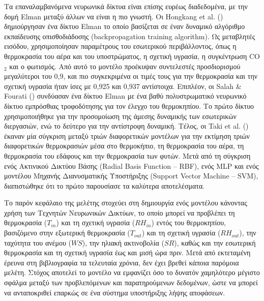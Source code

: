 \documentclass[12pt, a4paper]{report} %
\newcommand{\english}{\foreignlanguage{english}}
\begin{document}
Τα επαναλαμβανόμενα νευρωνικά δίκτυα είναι επίσης ευρέως διαδεδομένα, με την δομή \english{Elman} μεταξύ άλλων να είναι 
η πιο γνωστή. Οι \english{Hongkang et al.} (\citeyear{neural_bib14}) δημιούργησαν ένα δίκτυο \english{Elman} το οποίο 
βασίζεται σε έναν δυναμικό αλγόριθμο εκπαίδευσης οπισθοδιάδοσης (\english{backpropagation training algorithm}). Ως 
μεταβλητές εισόδου, χρησιμοποίησαν παραμέτρους του εσωτερικού περιβάλλοντος, όπως η θερμοκρασία του αέρα και του 
υποστρώματος, η σχετική υγρασία, η συγκέντρωση \english{CO$_2$} και ο φωτισμός. Από αυτό το μοντέλο προέκυψαν συντελεστές 
προσδιορισμού μεγαλύτεροι του 0,9, και πιο συγκεκριμένα οι τιμές τους για την θερμοκρασία και την σχετική υγρασία ήταν 
ίσες με 0,925 και 0,937 αντίστοιχα. Επιπλέον, οι \english{Salah \& Fourati} (\citeyear{neural_bib15}) συνδύασαν ένα δίκτυο 
\english{Elman} με ένα βαθύ πολυστρωματικό νευρωνικό δίκτυο εμπρόσθιας τροφοδότησης για τον έλεγχο του θερμοκηπίου. 
Το πρώτο δίκτυο χρησιμοποιήθηκε για την προσομοίωση της άμεσης δυναμικής των εσωτερικών διεργασιών, ενώ το δεύτερο για 
την αντίστροφη δυναμική. Τέλος, οι \english{Taki et al.} (\citeyear{neural_bib16}) έκαναν μία σύγκριση μεταξύ τριών 
διαφορετικών μοντέλων για την εκτίμηση τριών διαφορετικών θερμοκρασιών μέσα στο θερμοκήπιο, τη θερμοκρασία του αέρα, τη 
θερμοκρασία του εδάφους και την θερμοκρασία των φυτών. Μετά από τη σύγκριση ενός Ακτινικού Δικτύου Βάσης 
(\english{Radial Basis Function – RBF}), ενός \english{MLP} και ενός μοντέλου Μηχανής Διανυσματικής Υποστήριξης 
(\english{Support Vector Machine – SVM}), διαπιστώθηκε ότι το πρώτο παρουσίασε τα καλύτερα αποτελέσματα.

Το παρόν κεφάλαιο της μελέτης στοχεύει στη δημιουργία ενός μοντέλου κάνοντας χρήση των Τεχνητών Νευρωνικών Δικτύων, 
το οποίο μπορεί να προβλέπει τη θερμοκρασία (\english{$T_{\text{$in$}}$}) και τη σχετική υγρασία 
(\english{$RH_{\text{$in$}}$}) εντός του θερμοκηπίου, βασιζόμενο στην εξωτερική θερμοκρασία (\english{$T_{\text{$out$}}$}) 
και τη σχετική υγρασία (\english{$RH_{\text{$out$}}$}), την ταχύτητα του ανέμου (\english{$WS$}), την ηλιακή ακτινοβολία 
(\english{$SR$}), καθώς και την εσωτερική θερμοκρασία και τη σχετική υγρασία έως και μισή ώρα πριν. Μετά από εκτεταμένη 
έρευνα στη βιβλιογραφία τα τελευταία χρόνια, δεν έχει βρεθεί κάποια παρόμοια μελέτη. Στόχος αποτελεί το μοντέλο να εμφανίζει 
όσο το δυνατόν χαμηλότερο μέγιστο σφάλμα μεταξύ των προβλεπόμενων και παρατηρούμενων δεδομένων, ώστε να μπορεί να 
ανταποκριθεί επαρκώς σε ένα σύστημα υποστήριξης λήψης αποφάσεων.
\end{document}
